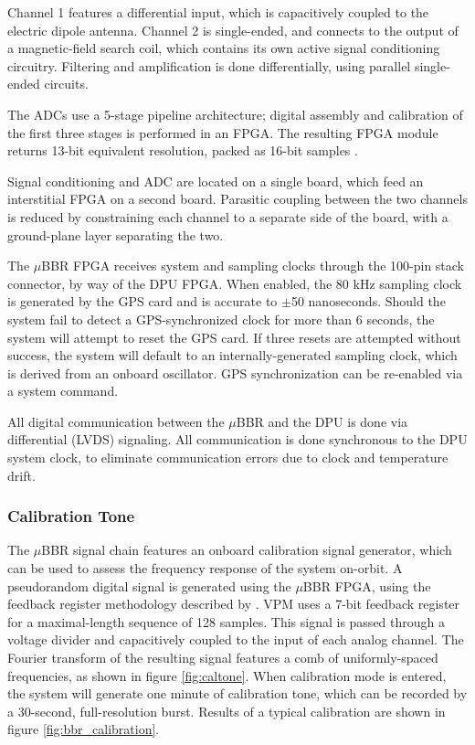 Channel 1 features a differential input, which is capacitively coupled to the electric dipole antenna. Channel 2 is single-ended, and connects to the output of a magnetic-field search coil, which contains its own active signal conditioning circuitry. Filtering and amplification is done differentially, using parallel single-ended circuits. 

The ADCs use a 5-stage pipeline architecture; digital assembly and calibration of the first three stages is performed in an FPGA. The resulting FPGA module returns 13-bit equivalent resolution, packed as 16-bit samples \citep{Wang2009}. 

Signal conditioning and ADC are located on a single board, which feed an interstitial FPGA on a second board. Parasitic coupling between the two channels is reduced by constraining each channel to a separate side of the board, with a ground-plane layer separating the two. 

The $\mu$BBR FPGA receives system and sampling clocks through the 100-pin stack connector, by way of the DPU FPGA. When enabled, the 80 kHz sampling clock is generated by the GPS card and is accurate to $\pm$50 nanoseconds. Should the system fail to detect a GPS-synchronized clock for more than 6 seconds, the system will attempt to reset the GPS card. If three resets are attempted without success, the system will default to an internally-generated sampling clock, which is derived from an onboard oscillator. GPS synchronization can be re-enabled via a system command.

All digital communication between the $\mu$BBR and the DPU is done via differential (LVDS) signaling. All communication is done synchronous to the DPU system clock, to eliminate communication errors due to clock and temperature drift.


 \subsubsection{Calibration Tone}
The $\mu$BBR signal chain features an onboard calibration signal generator, which can be used to assess the frequency response of the system on-orbit. A pseudorandom digital signal is generated using the $\mu$BBR FPGA, using the feedback register methodology described by \cite{Paschal2005}. VPM uses a 7-bit feedback register for a maximal-length sequence of 128 samples. This signal is passed through a voltage divider and capacitively coupled to the input of each analog channel. The Fourier transform of the resulting signal features a comb of uniformly-spaced frequencies, as shown in figure \ref{fig:caltone}. When calibration mode is entered, the system will generate one minute of calibration tone, which can be recorded by a 30-second, full-resolution burst. Results of a typical calibration are shown in figure  \ref{fig:bbr_calibration}.

